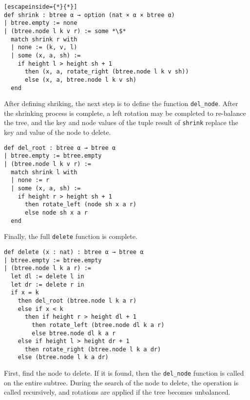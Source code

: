 \begin{lstlisting}[escapeinside={*}{*}]
def shrink : btree α → option (nat × α × btree α)
| btree.empty := none
| (btree.node l k v r) := some *\$*
  match shrink r with
  | none := (k, v, l)
  | some (x, a, sh) :=
    if height l > height sh + 1
      then (x, a, rotate_right (btree.node l k v sh))
      else (x, a, btree.node l k v sh)
  end
\end{lstlisting}

After defining shriking, the next step is to define the function \lstinline{del_node}. After the shrinking process is complete, a left rotation may be completed to re-balance the tree, and the key and node values of the tuple result of \lstinline{shrink} replace the key and value of the node to delete.

\begin{lstlisting}
def del_root : btree α → btree α
| btree.empty := btree.empty
| (btree.node l k v r) :=
  match shrink l with 
  | none := r
  | some (x, a, sh) :=
    if height r > height sh + 1 
      then rotate_left (node sh x a r)
      else node sh x a r
  end
\end{lstlisting}

Finally, the full \lstinline{delete} function is complete. 

\begin{lstlisting}
def delete (x : nat) : btree α → btree α
| btree.empty := btree.empty
| (btree.node l k a r) :=
  let dl := delete l in
  let dr := delete r in
  if x = k 
    then del_root (btree.node l k a r)
    else if x < k 
      then if height r > height dl + 1 
        then rotate_left (btree.node dl k a r)
        else btree.node dl k a r
    else if height l > height dr + 1 
      then rotate_right (btree.node l k a dr)
    else (btree.node l k a dr)
\end{lstlisting}

First, find the node to delete. If it is found, then the \lstinline{del_node} function is called on the entire subtree. During the search of the node to delete, the operation is called recursively, and rotations are applied if the tree becomes unbalanced. 